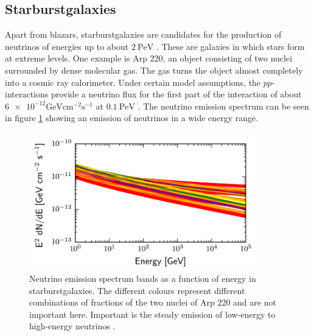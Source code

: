 \subsection{Starburstgalaxies}

Apart from blazars, starburstgalaxies are candidates for the production of neutrinos of energies up to about $\SI{2}{\peta\electronvolt}$ \cite{starburst2}.
These are galaxies in which stars form at extreme levels.
One example is Arp 220, an object consisting of two nuclei surrounded by dense molecular gas.
The gas turns the object almost completely into a cosmic ray calorimeter.
Under certain model assumptions, the $pp$-interactions provide a neutrino flux for the first part of the interaction of about $\num{6e-12}\si{\giga\electronvolt\centi\meter\tothe{-2}\second\tothe{-1}}$ at $\SI{0.1}{\peta\electronvolt}$ \cite{starburst}.
The neutrino emission spectrum can be seen in figure \ref{fig:starburst} showing an emission of neutrinos in a wide energy range.
\begin{figure}
    \centering
    \includegraphics[width=10cm]{Plots/01_5_astroparticle/starburst_flux.png}
    \caption{Neutrino emission spectrum bands as a function of energy in starburstgalaxies. The different colours represent different combinations of fractions of the two nuclei of Arp 220 and are not important here. Important is the steady emission of low-energy to high-energy neutrinos \cite{starburst}.}
    \label{fig:starburst}
\end{figure}
